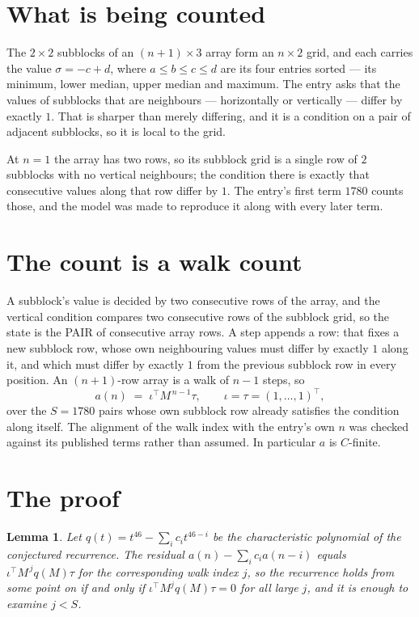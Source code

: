 \documentclass[11pt,a4paper]{article}
\theoremstyle{plain}
\newtheorem{lemma}[theorem]{Lemma}
\theoremstyle{definition}
\begin{document}
\section{What is being counted}

The $2\times2$ subblocks of an $(n+1)\times3$ array form an
$n\times2$ grid, and each carries the value $\sigma=-c+d$, where $a\le b\le c\le d$ are its four entries sorted --- its minimum, lower median, upper median and maximum. The entry asks that the values of
subblocks that are neighbours --- horizontally or vertically --- differ by exactly $1$.
That is sharper than merely differing, and it is a condition on a pair of adjacent subblocks,
so it is local to the grid.

At $n=1$ the array has two rows, so its subblock grid is a single row of $2$ subblocks with
no vertical neighbours; the condition there is exactly that consecutive values along that row
differ by $1$. The entry's first term $1780$ counts those, and the model was made to
reproduce it along with every later term.

\section{The count is a walk count}

A subblock's value is decided by two consecutive rows of the array, and the
vertical condition compares two consecutive rows of the subblock grid, so the state is the
PAIR of consecutive array rows. A step appends a row: that fixes a new subblock row, whose own
neighbouring values must differ by exactly $1$ along it, and which must differ by exactly
$1$ from the previous subblock row in every position. An $(n+1)$-row array is a walk of
$n-1$ steps, so
\[
a(n)\;=\;\iota^{\!\top}M^{\,n-1}\tau,\qquad\iota=\tau=(1,\dots,1)^{\!\top},
\]
over the $S=1780$ pairs whose own subblock row already satisfies the condition along itself.
The alignment of the walk index with the entry's own $n$ was checked against its published
terms rather than assumed. In particular $a$ is $C$-finite.

\section{The proof}

\begin{lemma}\label{lem:crit}
Let $q(t)=t^{46}-\sum_i c_it^{46-i}$ be the characteristic polynomial of the
conjectured recurrence. The residual $a(n)-\sum_ic_ia(n-i)$ equals
$\iota^{\!\top}M^{\,j}q(M)\tau$ for the corresponding walk index $j$, so the recurrence
holds from some point on if and only if $\iota^{\!\top}M^{j}q(M)\tau=0$ for all large $j$,
and it is enough to examine $j<S$.
\end{lemma}
\end{document}
